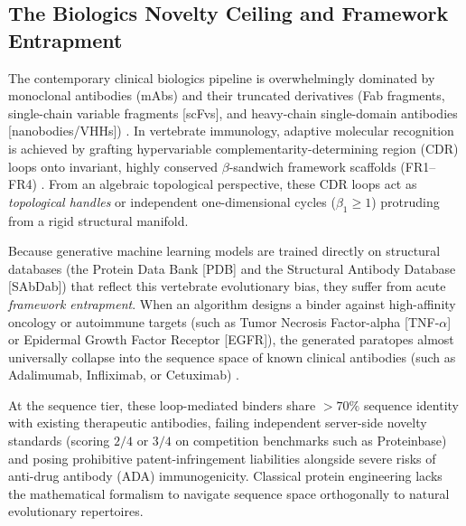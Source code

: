 \subsection{The Biologics Novelty Ceiling and Framework Entrapment}
The contemporary clinical biologics pipeline is overwhelmingly dominated by monoclonal antibodies (mAbs) and their truncated derivatives (Fab fragments, single-chain variable fragments [scFvs], and heavy-chain single-domain antibodies [nanobodies/VHHs]) \cite{almagro2019antibody}. In vertebrate immunology, adaptive molecular recognition is achieved by grafting hypervariable complementarity-determining region (CDR) loops onto invariant, highly conserved $\beta$-sandwich framework scaffolds (FR1--FR4) \cite{chothia1987canonical}. From an algebraic topological perspective, these CDR loops act as \textit{topological handles} or independent one-dimensional cycles ($\beta_1 \ge 1$) protruding from a rigid structural manifold.

Because generative machine learning models are trained directly on structural databases (the Protein Data Bank [PDB] and the Structural Antibody Database [SAbDab]) that reflect this vertebrate evolutionary bias, they suffer from acute \textit{framework entrapment}. When an algorithm designs a binder against high-affinity oncology or autoimmune targets (such as Tumor Necrosis Factor-alpha [TNF-$\alpha$] or Epidermal Growth Factor Receptor [EGFR]), the generated paratopes almost universally collapse into the sequence space of known clinical antibodies (such as Adalimumab, Infliximab, or Cetuximab) \cite{eck1989structure, li2005structural}. 

At the sequence tier, these loop-mediated binders share $>70\%$ sequence identity with existing therapeutic antibodies, failing independent server-side novelty standards (scoring $2/4$ or $3/4$ on competition benchmarks such as Proteinbase) and posing prohibitive patent-infringement liabilities alongside severe risks of anti-drug antibody (ADA) immunogenicity. Classical protein engineering lacks the mathematical formalism to navigate sequence space orthogonally to natural evolutionary repertoires.

